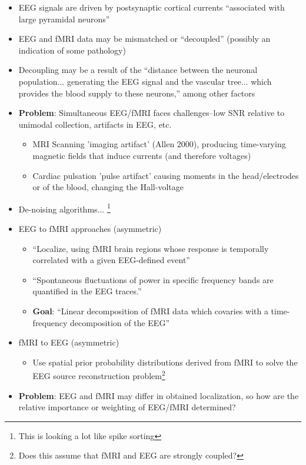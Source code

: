 \documentclass{article}
\begin{document}
{            \begin{itemize}
                \item EEG signals are driven by postsynaptic cortical currents 
    ``associated with
                large pyramidal neurons''
                \item EEG and fMRI data may be mismatched or ``decoupled''
(possibly an indication of some pathology)
                \item Decoupling may be a result of the ``distance between the
neuronal population... generating the EEG signal and the vascular tree... which
provides the blood supply to these neurons,'' among other factors
                \item \textbf{Problem}: Simultaneous EEG/fMRI faces
challenges--low SNR relative to unimodal collection, artifacts in EEG, etc.
                \begin{itemize}
                    \item MRI Scanning 'imaging artifact' (Allen 2000),
producing time-varying magnetic fields that induce currents (and therefore
voltages)
                    \item Cardiac pulsation 'pulse artifact' causing moments in
the head/electrodes or of the blood, changing the Hall-voltage
                \end{itemize}
                \item De-noising algorithms... \footnote{This is looking a lot
like spike sorting}
                \item EEG to fMRI approaches (asymmetric)
                \begin{itemize}
                    \item ``Localize, using fMRI brain regions whose response is
temporally correlated with a given EEG-defined event''
                    \item ``Spontaneous fluctuations of power in specific
frequency bands are quantified in the EEG traces.''
                    \item \textbf{Goal}: ``Linear decomposition of fMRI data
which covaries with a time-frequency decomposition of the EEG''
                \end{itemize}                    
                \item fMRI to EEG (asymmetric)
                \begin{itemize}
                    \item Use spatial prior probability distributions derived
from fMRI to solve the EEG source reconstruction problem\footnote{Does this
assume that fMRI and EEG are strongly coupled?}      
                \end{itemize}
                \item \textbf{Problem}: EEG and fMRI may differ in obtained
localization, so how are the relative importance or weighting of EEG/fMRI
determined?
            \end{itemize}

}
\end{document}
